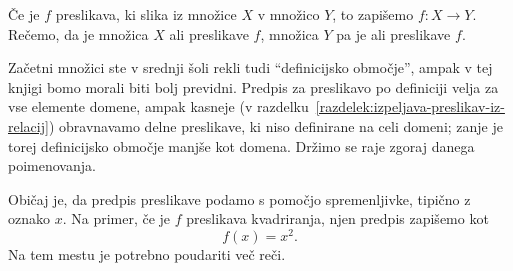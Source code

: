 Če je $f$ preslikava, ki slika iz množice $X$ v množico $Y$, to zapišemo $f\colon X \to Y$. Rečemo, da je množica $X$  ali  preslikave $f$, množica $Y$ pa je  ali  preslikave $f$.

Začetni množici ste v srednji šoli rekli tudi ``definicijsko območje'', ampak v tej knjigi bomo morali biti bolj previdni. Predpis za preslikavo po definiciji velja za vse elemente domene, ampak kasneje (v razdelku~\ref{razdelek:izpeljava-preslikav-iz-relacij}) obravnavamo delne preslikave, ki niso definirane na celi domeni; zanje je torej definicijsko območje manjše kot domena. Držimo se raje zgoraj danega poimenovanja.

Običaj je, da predpis preslikave podamo s pomočjo spremenljivke, tipično z oznako $x$. Na primer, če je $f$ preslikava kvadriranja, njen predpis zapišemo kot
\[f(x) = x^2.\]
Na tem mestu je potrebno poudariti več reči.
